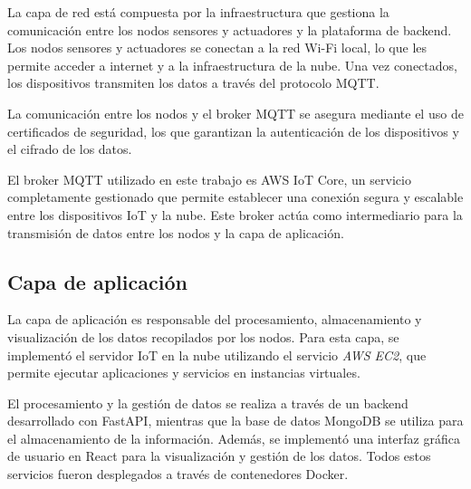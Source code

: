 La capa de red está compuesta por la infraestructura que gestiona la
comunicación entre los nodos sensores y actuadores y la plataforma de backend.
Los nodos sensores y actuadores se conectan a la red Wi-Fi local, lo que les
permite acceder a internet y a la infraestructura de la nube. Una vez
conectados, los dispositivos transmiten los datos a través del protocolo MQTT.

La comunicación entre los nodos y el broker MQTT se asegura mediante el uso de
certificados de seguridad, los que garantizan la autenticación de los
dispositivos y el cifrado de los datos.

El broker MQTT utilizado en este trabajo es AWS IoT Core, un servicio
completamente gestionado que permite establecer una conexión segura y escalable
entre los dispositivos IoT y la nube. Este broker actúa como intermediario para
la transmisión de datos entre los nodos y la capa de aplicación.

\subsection{Capa de aplicación}

La capa de aplicación es responsable del procesamiento, almacenamiento y
visualización de los datos recopilados por los nodos. Para esta capa, se
implementó el servidor IoT en la nube utilizando el servicio \textit{AWS EC2},
que permite ejecutar aplicaciones y servicios en instancias virtuales.

El procesamiento y la gestión de datos se realiza a través de un backend
desarrollado con FastAPI, mientras que la base de datos MongoDB se utiliza para
el almacenamiento de la información. Además, se implementó una interfaz gráfica
de usuario en React para la visualización y gestión de los datos. Todos estos
servicios fueron desplegados a través de contenedores Docker.



